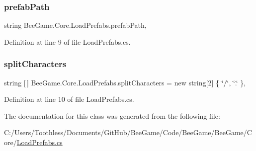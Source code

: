\subsubsection{\texorpdfstring{prefab\+Path}{prefabPath}}
{\footnotesize\ttfamily string Bee\+Game.\+Core.\+Load\+Prefabs.\+prefab\+Path\hspace{0.3cm}{\ttfamily [static]}, {\ttfamily [private]}}



Definition at line 9 of file Load\+Prefabs.\+cs.

\mbox{\label{class_bee_game_1_1_core_1_1_load_prefabs_a774463c4978def7fe0052c4ed1b46549}} 
\subsubsection{\texorpdfstring{split\+Characters}{splitCharacters}}
{\footnotesize\ttfamily string \mbox{[}$\,$\mbox{]} Bee\+Game.\+Core.\+Load\+Prefabs.\+split\+Characters = new string\mbox{[}2\mbox{]} \{ \char`\"{}/\char`\"{}, \char`\"{}.\char`\"{} \}\hspace{0.3cm}{\ttfamily [static]}, {\ttfamily [private]}}



Definition at line 10 of file Load\+Prefabs.\+cs.



The documentation for this class was generated from the following file\+:\begin{DoxyCompactItemize}
\item 
C\+:/\+Users/\+Toothless/\+Documents/\+Git\+Hub/\+Bee\+Game/\+Code/\+Bee\+Game/\+Bee\+Game/\+Core/\hyperlink{_load_prefabs_8cs}{Load\+Prefabs.\+cs}\end{DoxyCompactItemize}
